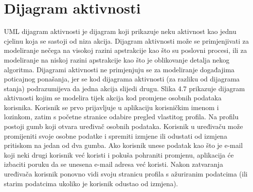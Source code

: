 		\section{Dijagram aktivnosti}
			
			
		{UML dijagram aktivnosti je dijagram koji prikazuje neku aktivnost kao jednu cjelinu koja se sastoji od niza akcija. Dijagram aktivnosti može se primjenjivati za modeliranje nečega na visokoj razini apstrakcije kao što su poslovni procesi, ili za modeliranje na niskoj razini apstrakcije kao što je oblikovanje detalja nekog algoritma. Dijagrami aktivnosti ne primjenjuju se za modeliranje događajima poticajnog ponašanja, jer se kod dijagrama aktivnosti (za razliku od dijagrama stanja) podrazumijeva da jedna akcija slijedi drugu. Slika 4.7 prikazuje dijagram aktivnosti kojim se modelira tijek akcija kod promjene osobnih podataka korisnika. Korisnik se prvo prijavljuje u aplikaciju korisničkim imenom i lozinkom, zatim s početne stranice odabire pregled vlastitog profila. Na profilu postoji gumb koji otvara uređivač osobnih podataka. Korisnik u uređivaču može promijeniti svoje osobne podatke i spremiti izmjene ili odustati od izmjena pritiskom na jedan od dva gumba. Ako korisnik unese podatak kao što je e-mail koji neki drugi korisnik već koristi i pokuša pohraniti promjenu, aplikacija će izbaciti poruku da se unesena e-mail adresa već koristi. Nakon zatvaranja uređivača korisnik ponovno vidi svoju stranicu profila s ažuriranim podatcima (ili starim podatcima ukoliko je korisnik odustao od izmjena).}
			
